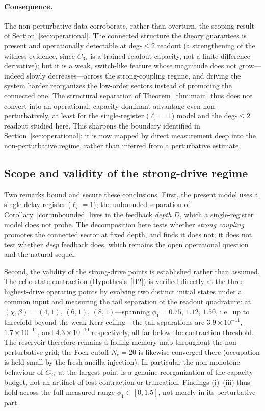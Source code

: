 \documentclass[11pt]{article}
\theoremstyle{remark}
\begin{document}
\paragraph{Consequence.} The non-perturbative data corroborate, rather than overturn,
the scoping result of Section~\ref{sec:operational}. The connected structure the
theory guarantees is present and operationally detectable at deg-$\le2$ readout (a
strengthening of the witness evidence, since $C_{3\mathrm{x}}$ is a trained-readout
capacity, not a finite-difference derivative); but it is a weak, switch-like feature
whose magnitude does not grow---indeed slowly decreases---across the strong-coupling
regime, and driving the system harder reorganizes the low-order sectors instead of
promoting the connected one. The structural separation of Theorem~\ref{thm:main} thus
does not convert into an operational, capacity-dominant advantage even
non-perturbatively, at least for the single-register ($\ell_\tau=1$) model and the
deg-$\le2$ readout studied here. This sharpens the boundary identified in
Section~\ref{sec:operational}: it is now mapped by direct measurement deep into the
non-perturbative regime, rather than inferred from a perturbative estimate.

\subsection{Scope and validity of the strong-drive regime}
\label{sec:strong-scope}

Two remarks bound and secure these conclusions. First, the present model uses a single
delay register ($\ell_\tau=1$); the unbounded separation of
Corollary~\ref{cor:unbounded} lives in the feedback \emph{depth} $D$, which a
single-register model does not probe. The decomposition here tests whether
\emph{strong coupling} promotes the connected sector at fixed depth, and finds it does
not; it does not test whether \emph{deep} feedback does, which remains the open
operational question and the natural sequel.

Second, the validity of the strong-drive points is established rather than assumed. The
echo-state contraction (Hypothesis~\ref{H2}) is verified directly at the three
highest-drive operating points by evolving two distinct initial states under a common
input and measuring the tail separation of the readout quadrature: at
$(\chi,\beta)=(4,1)$, $(6,1)$, $(8,1)$---spanning $\phi_1=0.75$, $1.12$, $1.50$, i.e.\
up to threefold beyond the weak-Kerr ceiling---the tail separations are
$3.9\times10^{-11}$, $1.7\times10^{-11}$, and $4.3\times10^{-10}$ respectively, all far
below the contraction threshold. The reservoir therefore remains a fading-memory map
throughout the non-perturbative grid; the Fock cutoff $N_c=20$ is likewise converged
there (occupation is held small by the fresh-ancilla injection). In particular the
non-monotone behaviour of $C_{2\mathrm{x}}$ at the largest point is a genuine
reorganization of the capacity budget, not an artifact of lost contraction or
truncation. Findings (i)--(iii) thus hold across the full measured range
$\phi_1\in[0,1.5]$, not merely in its perturbative part.
\end{document}
